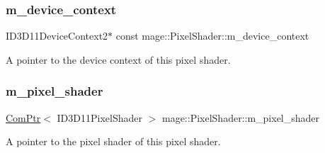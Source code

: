 \subsubsection{\texorpdfstring{m\+\_\+device\+\_\+context}{m\_device\_context}}
{\footnotesize\ttfamily I\+D3\+D11\+Device\+Context2$\ast$ const mage\+::\+Pixel\+Shader\+::m\+\_\+device\+\_\+context\hspace{0.3cm}{\ttfamily [protected]}}

A pointer to the device context of this pixel shader. \hypertarget{classmage_1_1_pixel_shader_a1dd0f87be1c1f7fe5a1bb2737263222f}{}\label{classmage_1_1_pixel_shader_a1dd0f87be1c1f7fe5a1bb2737263222f} 
\subsubsection{\texorpdfstring{m\+\_\+pixel\+\_\+shader}{m\_pixel\_shader}}
{\footnotesize\ttfamily \hyperlink{namespacemage_ae74f374780900893caa5555d1031fd79}{Com\+Ptr}$<$ I\+D3\+D11\+Pixel\+Shader $>$ mage\+::\+Pixel\+Shader\+::m\+\_\+pixel\+\_\+shader\hspace{0.3cm}{\ttfamily [protected]}}

A pointer to the pixel shader of this pixel shader. 
